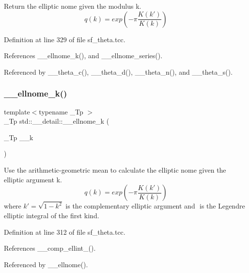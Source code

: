 Return the elliptic nome given the modulus {\ttfamily k}. \[ q(k) = exp\left(-\pi\frac{K(k')}{K(k)}\right) \] 

Definition at line 329 of file sf\+\_\+theta.\+tcc.



References \+\_\+\+\_\+ellnome\+\_\+k(), and \+\_\+\+\_\+ellnome\+\_\+series().



Referenced by \+\_\+\+\_\+theta\+\_\+c(), \+\_\+\+\_\+theta\+\_\+d(), \+\_\+\+\_\+theta\+\_\+n(), and \+\_\+\+\_\+theta\+\_\+s().

\mbox{\label{namespacestd_1_1____detail_a7631f367a1be34f98cec2021d588457b}} 
\subsubsection{\texorpdfstring{\+\_\+\+\_\+ellnome\+\_\+k()}{\_\_ellnome\_k()}}
{\footnotesize\ttfamily template$<$typename \+\_\+\+Tp $>$ \\
\+\_\+\+Tp std\+::\+\_\+\+\_\+detail\+::\+\_\+\+\_\+ellnome\+\_\+k (\begin{DoxyParamCaption}\item[{\+\_\+\+Tp}]{\+\_\+\+\_\+k }\end{DoxyParamCaption})}

Use the arithmetic-\/geometric mean to calculate the elliptic nome given the elliptic argument k. \[ q(k) = exp\left(-\pi\frac{K(k')}{K(k)}\right) \] where $ k' = \sqrt{1 - k^2} $ is the complementary elliptic argument and $ $ is the Legendre elliptic integral of the first kind. 

Definition at line 312 of file sf\+\_\+theta.\+tcc.



References \+\_\+\+\_\+comp\+\_\+ellint\+\_().



Referenced by \+\_\+\+\_\+ellnome().

\mbox{\label{namespacestd_1_1____detail_aec07b9131f90495831d349d22768425f}} 

